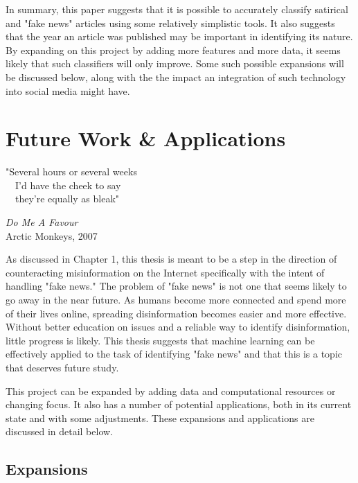 \documentclass [12 pt] {report}
\begin{document}
In summary, this paper suggests that it is possible to accurately classify satirical and "fake news" articles using some relatively simplistic tools. It also suggests that the year an article was published may be important in identifying its nature. By expanding on this project by adding more features and more data, it seems likely that such classifiers will only improve. Some such possible expansions will be discussed below, along with the the impact an integration of such technology into social media might have.
\chapter{Future Work \& Applications}
\singlespacing
\epigraph{"Several hours or several weeks\\~~I'd have the cheek to say\\~~they're equally as bleak"}{\textit{Do Me A Favour}\\Arctic Monkeys, 2007}
\onehalfspacing
As discussed in Chapter 1, this thesis is meant to be a step in the direction of counteracting misinformation on the Internet specifically with the intent of handling "fake news." The problem of "fake news" is not one that seems likely to go away in the near future. As humans become more connected and spend more of their lives online, spreading disinformation becomes easier and more effective. Without better education on issues and a reliable way to identify disinformation, little progress is likely. This thesis suggests that machine learning can be effectively applied to the task of identifying "fake news" and that this is a topic that deserves future study.

This project can be expanded by adding data and computational resources or changing focus. It also has a number of potential applications, both in its current state and with some adjustments. These expansions and applications are discussed in detail below.
\section{Expansions}
\end{document}
